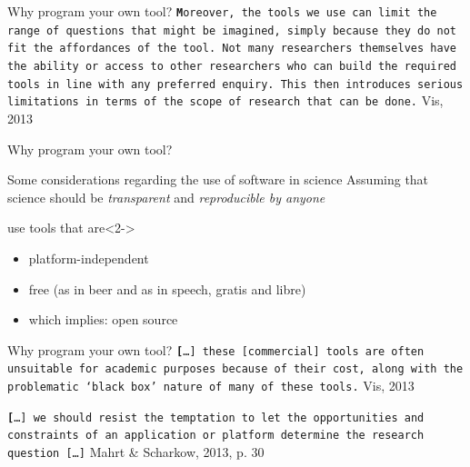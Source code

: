 \documentclass{beamer}
\begin{document}
\begin{frame}{Why program your own tool?}
\vspace{1cm}
{\tt \textbf
Moreover, the tools we use can limit the range of questions that might be imagined, simply because they do not fit the affordances of the tool. Not many researchers themselves have the ability or access to other researchers who can build the required tools in line with any preferred enquiry. This then introduces serious limitations in terms of the scope of research that can be done.}
\vspace{1cm}
\footnotesize{Vis, 2013\\}

\end{frame}


\begin{frame}{Why program your own tool?}
\end{frame}

\begin{frame}{Some considerations regarding the use of software in science}
Assuming that science should be \emph{transparent} and \emph{reproducible by anyone}
\begin{block}{use tools that are}<2->
\begin{itemize}
\item platform-independent 
\item free (as in beer and as in speech, gratis and libre)
\item which implies: open source
\end{itemize}
\end{block}
\end{frame}

\begin{frame}{Why program your own tool?}
\vspace{1cm}
{\tt \textbf
{[}\ldots{]} these {[}commercial{]} tools are often unsuitable for academic purposes because of their cost, along with the problematic ‘black box’ nature of many of these tools.}
{\footnotesize{Vis, 2013\\}}
\vspace{1cm}

{\tt \textbf
{[}\ldots{]} we should resist the temptation to let the opportunities and constraints of an application or platform determine the research question {[}\ldots{]}}
{\footnotesize{Mahrt \& Scharkow, 2013, p. 30\\}}

\end{frame}
\end{document}

